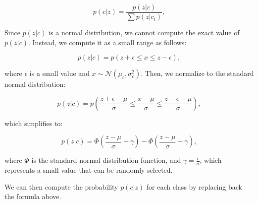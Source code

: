 \documentclass{article}
\begin{document}
\begin{equation}
    p(c|z) = \frac{p(z|c)}{\sum p(z|c_i)},
\end{equation}

Since \( p(z|c) \) is a normal distribution, we cannot compute the exact value of \( p(z|c) \). Instead, we compute it as a small range as follows:

\[
p(z|c) = p(z + \epsilon \leq x \leq z - \epsilon),
\]

where \( \epsilon \) is a small value and \( x \sim \mathcal{N}(\mu_c, \sigma_c^2) \). Then, we normalize to the standard normal distribution:

\[
p(z|c) = p\left(\frac{z + \epsilon - \mu}{\sigma} \leq \frac{x - \mu}{\sigma} \leq \frac{z - \epsilon - \mu}{\sigma}\right),
\]

which simplifies to:

\[
p(z|c) = \Phi\left(\frac{z - \mu}{\sigma} + \gamma\right) - \Phi\left(\frac{z - \mu}{\sigma} - \gamma\right),
\]

where \( \Phi \) is the standard normal distribution function, and \( \gamma = \frac{\epsilon}{\sigma} \), which represents a small value that can be randomly selected.

We can then compute the probability \( p(c|z) \) for each class by replacing back the formula above.
\end{document}
